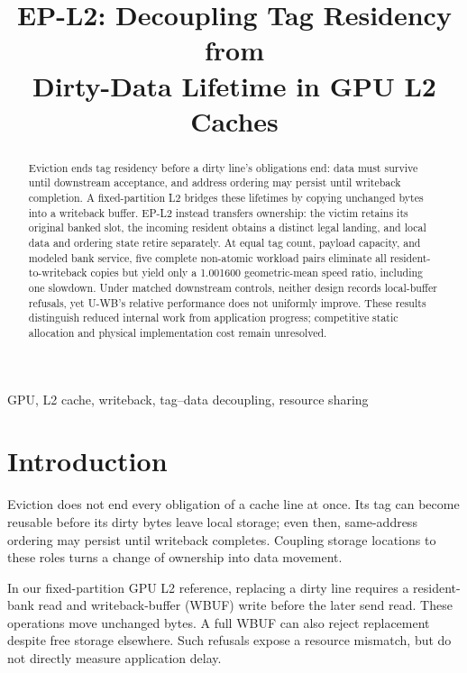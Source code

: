 \documentclass[conference,letterpaper]{IEEEtran}
\begin{document}
\title{EP-L2: Decoupling Tag Residency from\\Dirty-Data Lifetime in GPU L2 Caches}
\author{}
\maketitle
\begin{abstract}
Eviction ends tag residency before a dirty line's obligations end: data must survive until downstream acceptance, and address ordering may persist until writeback completion. A fixed-partition L2 bridges these lifetimes by copying unchanged bytes into a writeback buffer. EP-L2 instead transfers ownership: the victim retains its original banked slot, the incoming resident obtains a distinct legal landing, and local data and ordering state retire separately. At equal tag count, payload capacity, and modeled bank service, five complete non-atomic workload pairs eliminate all resident-to-writeback copies but yield only a 1.001600 geometric-mean speed ratio, including one slowdown. Under matched downstream controls, neither design records local-buffer refusals, yet U-WB's relative performance does not uniformly improve. These results distinguish reduced internal work from application progress; competitive static allocation and physical implementation cost remain unresolved.
\end{abstract}

\begin{IEEEkeywords}
GPU, L2 cache, writeback, tag--data decoupling, resource sharing
\end{IEEEkeywords}

\section{Introduction}
Eviction does not end every obligation of a cache line at once. Its tag can become reusable before its dirty bytes leave local storage; even then, same-address ordering may persist until writeback completes. Coupling storage locations to these roles turns a change of ownership into data movement.

In our fixed-partition GPU L2 reference, replacing a dirty line requires a resident-bank read and writeback-buffer (WBUF) write before the later send read. These operations move unchanged bytes. A full WBUF can also reject replacement despite free storage elsewhere. Such refusals expose a resource mismatch, but do not directly measure application delay.
\end{document}
